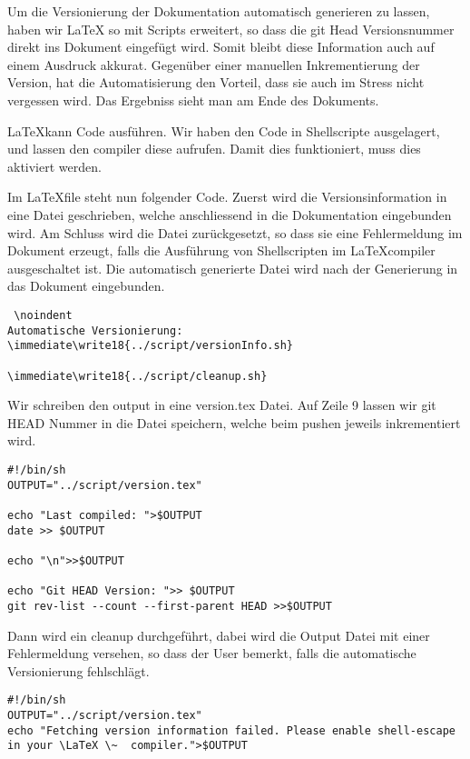 Um die  Versionierung der Dokumentation automatisch generieren zu lassen, haben wir LaTeX so mit Scripts erweitert, so dass die git Head Versionsnummer
direkt ins Dokument eingefügt wird. Somit bleibt diese Information auch auf einem Ausdruck akkurat. Gegenüber einer manuellen Inkrementierung der Version, hat die Automatisierung
den Vorteil, dass sie auch im Stress nicht vergessen wird. Das Ergebniss sieht man am Ende des Dokuments.

\LaTeX kann Code ausführen. Wir haben den Code in Shellscripte ausgelagert, und lassen den compiler diese aufrufen. Damit dies funktioniert, muss dies aktiviert werden.

Im \LaTeX file steht nun folgender Code.
Zuerst wird die Versionsinformation in eine Datei geschrieben, welche anschliessend in die Dokumentation eingebunden wird.
Am Schluss wird die Datei zurückgesetzt, so dass sie eine Fehlermeldung im Dokument erzeugt, falls die Ausführung von Shellscripten im \LaTeX compiler ausgeschaltet ist.
Die automatisch generierte Datei wird nach der Generierung in das Dokument eingebunden.
\begin{lstlisting}
 \noindent
Automatische Versionierung:
\immediate\write18{../script/versionInfo.sh}

\immediate\write18{../script/cleanup.sh}
\end{lstlisting}


Wir schreiben den output in eine version.tex Datei. Auf Zeile 9 lassen wir git HEAD Nummer in die Datei speichern, welche beim pushen jeweils inkrementiert wird.
\begin{lstlisting}
#!/bin/sh
OUTPUT="../script/version.tex"

echo "Last compiled: ">$OUTPUT
date >> $OUTPUT

echo "\n">>$OUTPUT

echo "Git HEAD Version: ">> $OUTPUT
git rev-list --count --first-parent HEAD >>$OUTPUT
\end{lstlisting}
Dann wird ein cleanup durchgeführt, dabei wird die Output Datei mit einer Fehlermeldung versehen, so dass der User bemerkt, falls die automatische Versionierung fehlschlägt.
\begin{lstlisting}
#!/bin/sh
OUTPUT="../script/version.tex"
echo "Fetching version information failed. Please enable shell-escape in your \LaTeX \~  compiler.">$OUTPUT
\end{lstlisting}
